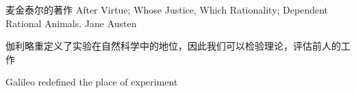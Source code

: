 

麦金泰尔的著作
    After Virtue; 
    Whose Justice, Which Rationality; 
    Dependent Rational Animals.
Jane Austen


伽利略重定义了实验在自然科学中的地位，因此我们可以检验理论，评估前人的工作

Galileo redefined the place of experiment

